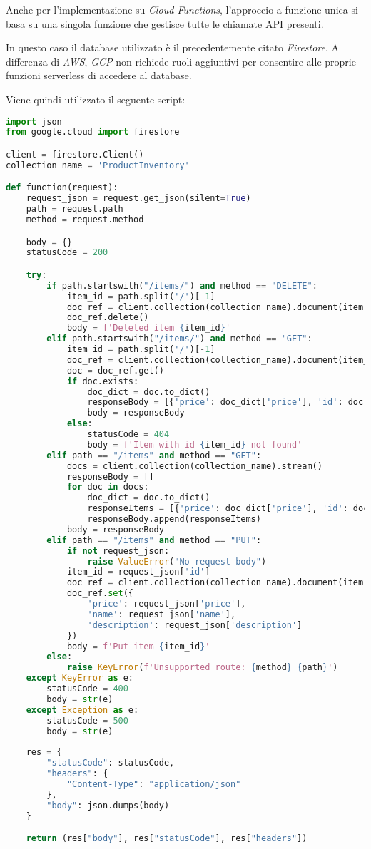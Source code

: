 Anche per l'implementazione su \textit{Cloud Functions}, l'approccio a funzione unica si basa su una singola funzione che gestisce tutte le chiamate API presenti.

In questo caso il database utilizzato è il precedentemente citato \textit{Firestore}. A differenza di \textit{AWS}, \textit{GCP} non richiede ruoli aggiuntivi per consentire alle proprie funzioni serverless di accedere al database.

Viene quindi utilizzato il seguente script:
\begin{lstlisting}[language=python]
import json
from google.cloud import firestore

client = firestore.Client()
collection_name = 'ProductInventory'

def function(request):
    request_json = request.get_json(silent=True)
    path = request.path
    method = request.method

    body = {}
    statusCode = 200

    try:
        if path.startswith("/items/") and method == "DELETE":
            item_id = path.split('/')[-1]
            doc_ref = client.collection(collection_name).document(item_id)
            doc_ref.delete()
            body = f'Deleted item {item_id}'
        elif path.startswith("/items/") and method == "GET":
            item_id = path.split('/')[-1]
            doc_ref = client.collection(collection_name).document(item_id)
            doc = doc_ref.get()
            if doc.exists:
                doc_dict = doc.to_dict()
                responseBody = [{'price': doc_dict['price'], 'id': doc.id, 'name': doc_dict['name'], 'description': doc_dict['description']}]
                body = responseBody
            else:
                statusCode = 404
                body = f'Item with id {item_id} not found'
        elif path == "/items" and method == "GET":
            docs = client.collection(collection_name).stream()
            responseBody = []
            for doc in docs:
                doc_dict = doc.to_dict()
                responseItems = [{'price': doc_dict['price'], 'id': doc.id, 'name': doc_dict['name'], 'description': doc_dict['description']}]
                responseBody.append(responseItems)
            body = responseBody
        elif path == "/items" and method == "PUT":
            if not request_json:
                raise ValueError("No request body")
            item_id = request_json['id']
            doc_ref = client.collection(collection_name).document(item_id)
            doc_ref.set({
                'price': request_json['price'],
                'name': request_json['name'],
                'description': request_json['description']
            })
            body = f'Put item {item_id}'
        else:
            raise KeyError(f'Unsupported route: {method} {path}')
    except KeyError as e:
        statusCode = 400
        body = str(e)
    except Exception as e:
        statusCode = 500
        body = str(e)
    
    res = {
        "statusCode": statusCode,
        "headers": {
            "Content-Type": "application/json"
        },
        "body": json.dumps(body)
    }

    return (res["body"], res["statusCode"], res["headers"])
\end{lstlisting}
